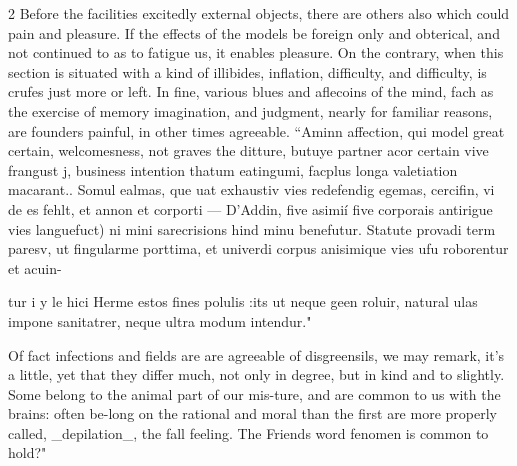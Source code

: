 \documentclass[10pt]{article}
\begin{document}
\begin{multicols}{2}
Before the facilities excitedly external objects, there are others also which could pain and pleasure. If the effects of the models be foreign only and obterical, and not continued to as to fatigue us, it enables pleasure. On the contrary, when this section is situated with a kind of illibides, inflation, difficulty, and difficulty, is crufes just more or left. In fine, various blues and aflecoins of the mind, fach as the exercise of memory imagination, and judgment, nearly for familiar reasons, are founders painful, in other times agreeable. “Aminn affection, qui model great certain, welcomesness, not graves the ditture, butuye partner acor certain vive frangust j, business intention thatum eatingumi, facplus longa valetiation macarant.. Somul ealmas, que uat exhaustiv vies redefendig egemas, cercifin, vi de es fehlt, et annon et corporti — D'Addin, five asimií five corporais antirigue vies languefuct) ni mini sarecrisions hind minu benefutur. Statute provadi term paresv, ut fingularme porttima, et univerdi corpus anisimique vies ufu roborentur et acuin-

tur i y le hici Herme estos fines polulis :its ut neque geen roluir, natural ulas impone sanitatrer, neque ultra modum intendur."

Of fact infections and fields are are agreeable of disgreensils, we may remark, it’s a little, yet that they differ much, not only in degree, but in kind and to slightly. Some belong to the animal part of our mis-ture, and are common to us with the brains: often be-long on the rational and moral than the first are more properly called, \_depilation\_, the fall feeling. The Friends word fenomen is common to hold?"


\end{multicols}
\end{document}
